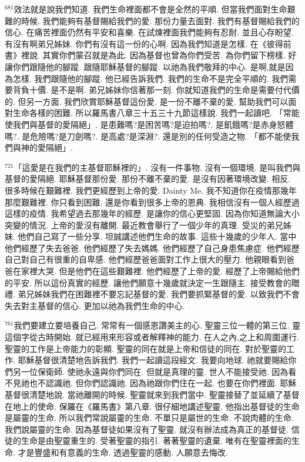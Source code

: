 \documentclass{book}
\begin{document}
$^{681}$效法就是說我們知道.
我們生命裡面都不會是全然的平順.
但當我們面對生命艱難的時候.
我們能夠有基督賜給我們的愛.
那份力量去面對.
我們有基督賜給我們的信心.
在痛苦裡面仍然有平安和喜樂.
在試煉裡面我們能夠有忍耐.
並且心存盼望.
有沒有啊弟兄姊妹.
你們有沒有這一份的心啊.
因為我們知道是怎樣.
在《彼得前書》裡說.
其實你們蒙召就是為此.
因為基督也曾為你們受苦.
為你們留下榜樣.
好讓你們跟隨他的腳蹤.
跟隨耶穌基督的腳蹤.
以祂為我們敬拜的中心.
是啊,就是因為怎樣.
我們跟隨他的腳蹤.
他已經告訴我們.
我們的生命不是完全平順的.
我們需要背負十價.
是不是啊.
弟兄姊妹你信著那一刻.
你就知道我們的生命是需要付代價的.
但另一方面.
我們欣賞耶穌基督這份愛.
是一份不離不棄的愛.
幫助我們可以面對生命各樣的困難.
所以羅馬書八章三十五三十九節這樣說.
我們一起讀吧.
「常能使我們與基督的愛隔絕」.
是患難嗎?是困苦嗎?是迫拍嗎?.
是飢餓嗎?是赤身怒體嗎?.
是危險嗎?是刀劍嗎?.
是高處?是深淵?.
還是別的任何受造之物.
「都不能使我們與神的愛隔絕」.

$^{721}$「這愛是在我們的主基督耶穌裡的」.
沒有一件事物.
沒有一個環境.
是叫我們與基督的愛隔絕.
耶穌基督那份愛.
那份不離不棄的愛.
是沒有因著環境改變.
相反.
很多時候在艱難裡.
我們更經歷到上帝的愛.
Dainty Me.
我不知道你在疫情那幾年那麼艱難裡.
你只看到困難.
還是你看到很多上帝的恩典.
我相信沒有一個人經歷過這樣的疫情.
我希望過去那幾年的經歷.
是讓你的信心更堅固.
因為你知道無論大小突變的情況.
上帝的愛沒有離開.
最近教會舉行了一個少年的真理.
受災的弟兄姊妹.
他們自己寫了一些分享.
坦誠講述他們生命的故事.
這些十幾歲的少年人.
當中他們經歷了失去爸爸.
他們經歷了失去媽媽.
他們經歷了自己身患焦慮症.
他們經歷自己對自己有很重的自卑感.
他們經歷爸爸面對工作上很大的壓力.
他親眼看到爸爸在家裡大哭.
但是他們在這些艱難裡.
他們經歷了上帝的愛.
經歷了上帝賜給他們的平安.
所以這份真實的經歷.
讓他們願意十幾歲就決定一生跟隨主.
接受教會的贈禮.
弟兄姊妹我們在困難裡不要忘記基督的愛.
我們要抓緊基督的愛.
以致我們不會失去對主基督的信心.
更加以祂為我們生命的中心.

$^{761}$我們要建立要培養自己.
常常有一個感恩讚美主的心.
聖靈三位一體的第三位.
靈這個字從古時開始.
就已經用來形容或者解釋神的能力.
在人之內,之上和周圍運行.
聖靈的工作是上帝能力的彰顯.
聖靈的同在就是上帝和信徒的同在.
對於聖靈的工作.
耶穌基督很清楚地告訴我們.
我們一起讀這段經文.
我要向地球.
祂就要賜給你們另一位保衛師.
使祂永遠與你們同在.
但就是真理的靈.
世人不能接受祂.
因為看不見祂也不認識祂.
但你們認識祂.
因為祂跟你們住在一起.
也要在你們裡面.
耶穌基督很清楚地說.
當祂離開的時候.
聖靈就來到我們當中.
聖靈接替了並延續了基督在地上的使命.
保羅在《羅馬書》第八章.
很仔細地講述聖靈.
他指出基督徒的生命是屬靈的生命.
所以我們常說屬靈的生命.
不單只是屬世的生命.
不說肉體的生命.
我們說屬靈的生命.
因為基督徒如果沒有了聖靈.
就沒有辦法成為真正的基督徒.
信徒的生命是由聖靈重生的.
受著聖靈的指引.
著著聖靈的遺棄.
唯有在聖靈裡面的生命.
才是豐盛和有意義的生命.
透過聖靈的感動.
人願意去悔改.
\end{document}
